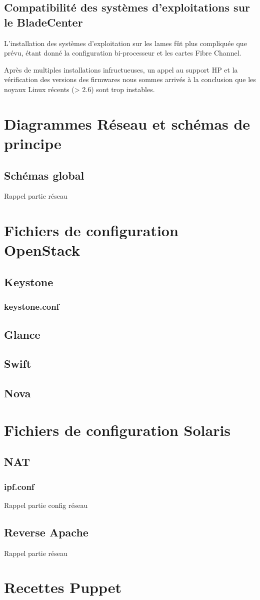 \documentclass{report}
\begin{document}
\section{Compatibilité des systèmes d'exploitations sur le BladeCenter}
L'installation des systèmes d'exploitation sur les lames fût plus compliquée que prévu, étant donné la configuration bi-processeur et les cartes Fibre Channel.

Après de multiples installations infructueuses, un appel au support HP et la vérification des versions des firmwares nous sommes arrivés à la conclusion que les noyaux Linux récents (> 2.6) sont trop instables. 

\appendix
\chapter{Diagrammes Réseau et schémas de principe}
\section{Schémas global}
Rappel partie réseau

\chapter{Fichiers de configuration OpenStack}
\section{Keystone}
\subsection{keystone.conf}

\section{Glance}

\section{Swift}

\section{Nova}

\chapter{Fichiers de configuration Solaris}
\section{NAT}
\subsection{ipf.conf}
Rappel partie config réseau
\section{Reverse Apache}
Rappel partie réseau

\chapter{Recettes Puppet}
\end{document}
